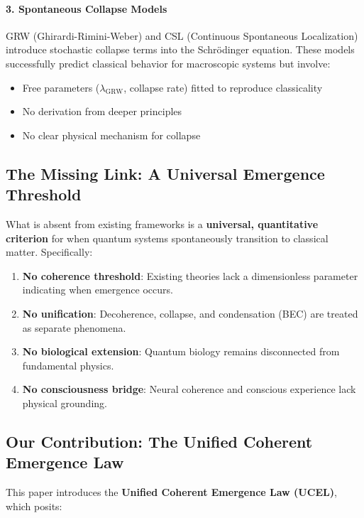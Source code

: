 \documentclass[12pt,a4paper]{article}
\begin{document}
\paragraph{3. Spontaneous Collapse Models}
GRW (Ghirardi-Rimini-Weber) \citep{ghirardi1986} and CSL (Continuous Spontaneous Localization) \citep{bassi2013} introduce stochastic collapse terms into the Schrödinger equation. These models successfully predict classical behavior for macroscopic systems but involve:
\begin{itemize}
    \item Free parameters ($\lambda_{\text{GRW}}$, collapse rate) fitted to reproduce classicality
    \item No derivation from deeper principles
    \item No clear physical mechanism for collapse
\end{itemize}

\subsection{The Missing Link: A Universal Emergence Threshold}

What is absent from existing frameworks is a \textbf{universal, quantitative criterion} for when quantum systems spontaneously transition to classical matter. Specifically:

\begin{enumerate}
    \item \textbf{No coherence threshold}: Existing theories lack a dimensionless parameter indicating when emergence occurs.
    \item \textbf{No unification}: Decoherence, collapse, and condensation (BEC) are treated as separate phenomena.
    \item \textbf{No biological extension}: Quantum biology remains disconnected from fundamental physics.
    \item \textbf{No consciousness bridge}: Neural coherence and conscious experience lack physical grounding.
\end{enumerate}

\subsection{Our Contribution: The Unified Coherent Emergence Law}

This paper introduces the \textbf{Unified Coherent Emergence Law (UCEL)}, which posits:
\end{document}
